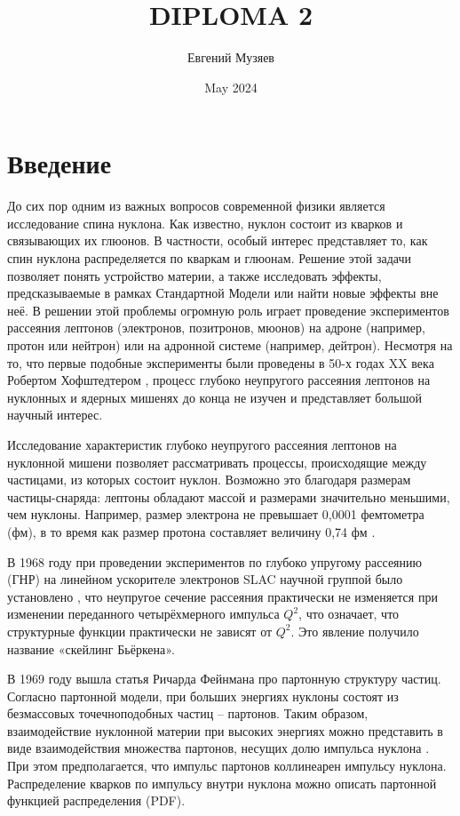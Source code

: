 \documentclass{extreport}
\title{DIPLOMA 2}
\author{Евгений Музяев}
\date{May
 2024}
\begin{document}



\newpage
\tableofcontents
\setcounter{page}{4}
\thispagestyle{headings}
\newpage


\chapter*{Введение}
\thispagestyle{headings}

До сих пор одним из важных вопросов современной физики является исследование спина нуклона. Как известно, нуклон состоит из кварков и связывающих их глюонов. В частности, особый интерес представляет то, как спин нуклона распределяется по кваркам и глюонам. Решение этой задачи позволяет понять устройство материи, а также исследовать эффекты, предсказываемые в рамках Стандартной Модели или найти новые эффекты вне неё. В решении этой проблемы огромную роль играет проведение экспериментов рассеяния лептонов (электронов, позитронов, мюонов) на адроне (например, протон или нейтрон) или на адронной системе (например, дейтрон). Несмотря на то, что первые подобные эксперименты были проведены в 50-х годах XX века Робертом Хофштедтером \cite{Hofstadter}, процесс глубоко неупругого рассеяния лептонов на нуклонных и ядерных мишенях до конца не изучен и представляет большой научный интерес.


Исследование характеристик глубоко неупругого рассеяния лептонов на нуклонной мишени позволяет рассматривать процессы, происходящие между частицами, из которых состоит нуклон. Возможно это благодаря размерам частицы-снаряда: лептоны обладают массой и размерами значительно меньшими, чем нуклоны. Например, размер электрона не превышает 0,0001 фемтометра (фм), в то время как размер протона составляет величину 0,74 фм \cite{Hofstadter}.


В 1968 году при проведении экспериментов по глубоко упругому рассеянию (ГНР) на линейном ускорителе электронов SLAC научной группой было установлено \cite{SLAC}, что неупругое сечение рассеяния практически не изменяется при изменении переданного четырёхмерного импульса $Q^2$, что означает, что структурные функции практически не зависят от $Q^2$. Это явление получило название «скейлинг Бьёркена».


В 1969 году вышла статья Ричарда Фейнмана про партонную структуру частиц. Согласно партонной модели, при больших энергиях нуклоны состоят из безмассовых точечноподобных частиц – партонов. Таким образом, взаимодействие нуклонной материи при высоких энергиях можно представить в виде взаимодействия множества партонов, несущих долю импульса нуклона \cite{Feynman}. При этом предполагается, что импульс партонов коллинеарен импульсу нуклона. Распределение кварков по импульсу внутри нуклона можно описать партонной функцией распределения (PDF).
\end{document}
